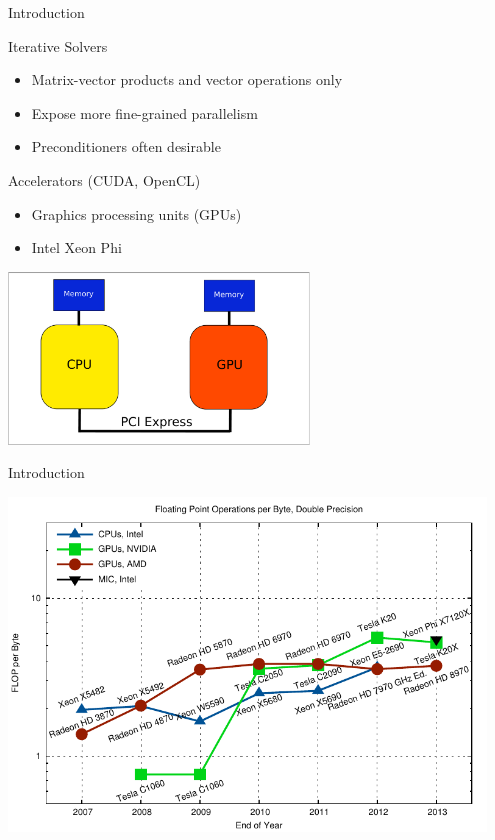 \begin{frame}[fragile]{Introduction}

 \begin{block}{Iterative Solvers}
   \begin{itemize}
    \item Matrix-vector products and vector operations only
    \item Expose more fine-grained parallelism
    \item Preconditioners often desirable
   \end{itemize}
 \end{block}

 \begin{block}{Accelerators (CUDA, OpenCL)}
   \begin{itemize}
    \item Graphics processing units (GPUs)
    \item Intel Xeon Phi
   \end{itemize}
 \end{block}

  \begin{center}
   \includegraphics[width=0.6\textwidth]{figures/cpu-gpu-coarse}
  \end{center}

\end{frame}

\begin{frame}{Introduction}
 \begin{center}
  \includegraphics[width=0.95\textwidth]{figures/flop-per-byte-dp}
 \end{center}
\end{frame}


